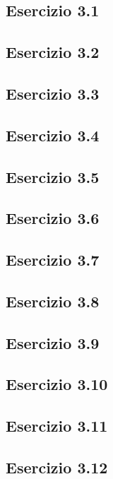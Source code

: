 \subsection{\textbf{Esercizio 3.1}}

\subsection{\textbf{Esercizio 3.2}}

\subsection{\textbf{Esercizio 3.3}}

\subsection{\textbf{Esercizio 3.4}}

\subsection{\textbf{Esercizio 3.5}}

\subsection{\textbf{Esercizio 3.6}}

\subsection{\textbf{Esercizio 3.7}}

\subsection{\textbf{Esercizio 3.8}}

\subsection{\textbf{Esercizio 3.9}}

\subsection{\textbf{Esercizio 3.10}}

\subsection{\textbf{Esercizio 3.11}}

\subsection{\textbf{Esercizio 3.12}}

